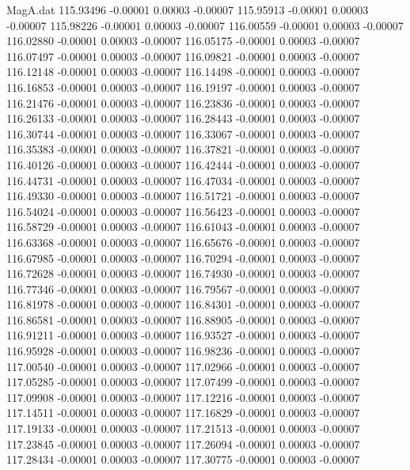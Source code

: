 \begin{filecontents}{MagA.dat}
 115.93496   -0.00001    0.00003   -0.00007
 115.95913   -0.00001    0.00003   -0.00007
 115.98226   -0.00001    0.00003   -0.00007
 116.00559   -0.00001    0.00003   -0.00007
 116.02880   -0.00001    0.00003   -0.00007
 116.05175   -0.00001    0.00003   -0.00007
 116.07497   -0.00001    0.00003   -0.00007
 116.09821   -0.00001    0.00003   -0.00007
 116.12148   -0.00001    0.00003   -0.00007
 116.14498   -0.00001    0.00003   -0.00007
 116.16853   -0.00001    0.00003   -0.00007
 116.19197   -0.00001    0.00003   -0.00007
 116.21476   -0.00001    0.00003   -0.00007
 116.23836   -0.00001    0.00003   -0.00007
 116.26133   -0.00001    0.00003   -0.00007
 116.28443   -0.00001    0.00003   -0.00007
 116.30744   -0.00001    0.00003   -0.00007
 116.33067   -0.00001    0.00003   -0.00007
 116.35383   -0.00001    0.00003   -0.00007
 116.37821   -0.00001    0.00003   -0.00007
 116.40126   -0.00001    0.00003   -0.00007
 116.42444   -0.00001    0.00003   -0.00007
 116.44731   -0.00001    0.00003   -0.00007
 116.47034   -0.00001    0.00003   -0.00007
 116.49330   -0.00001    0.00003   -0.00007
 116.51721   -0.00001    0.00003   -0.00007
 116.54024   -0.00001    0.00003   -0.00007
 116.56423   -0.00001    0.00003   -0.00007
 116.58729   -0.00001    0.00003   -0.00007
 116.61043   -0.00001    0.00003   -0.00007
 116.63368   -0.00001    0.00003   -0.00007
 116.65676   -0.00001    0.00003   -0.00007
 116.67985   -0.00001    0.00003   -0.00007
 116.70294   -0.00001    0.00003   -0.00007
 116.72628   -0.00001    0.00003   -0.00007
 116.74930   -0.00001    0.00003   -0.00007
 116.77346   -0.00001    0.00003   -0.00007
 116.79567   -0.00001    0.00003   -0.00007
 116.81978   -0.00001    0.00003   -0.00007
 116.84301   -0.00001    0.00003   -0.00007
 116.86581   -0.00001    0.00003   -0.00007
 116.88905   -0.00001    0.00003   -0.00007
 116.91211   -0.00001    0.00003   -0.00007
 116.93527   -0.00001    0.00003   -0.00007
 116.95928   -0.00001    0.00003   -0.00007
 116.98236   -0.00001    0.00003   -0.00007
 117.00540   -0.00001    0.00003   -0.00007
 117.02966   -0.00001    0.00003   -0.00007
 117.05285   -0.00001    0.00003   -0.00007
 117.07499   -0.00001    0.00003   -0.00007
 117.09908   -0.00001    0.00003   -0.00007
 117.12216   -0.00001    0.00003   -0.00007
 117.14511   -0.00001    0.00003   -0.00007
 117.16829   -0.00001    0.00003   -0.00007
 117.19133   -0.00001    0.00003   -0.00007
 117.21513   -0.00001    0.00003   -0.00007
 117.23845   -0.00001    0.00003   -0.00007
 117.26094   -0.00001    0.00003   -0.00007
 117.28434   -0.00001    0.00003   -0.00007
 117.30775   -0.00001    0.00003   -0.00007

\end{filecontents}
